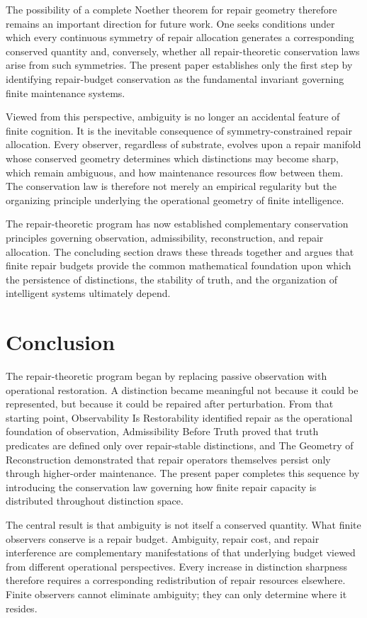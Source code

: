 \documentclass[12pt,oneside]{article}
\theoremstyle{plain}
\theoremstyle{definition}
\theoremstyle{remark}
\begin{document}
The possibility of a complete Noether theorem for repair geometry therefore remains an important direction for future work. One seeks conditions under which every continuous symmetry of repair allocation generates a corresponding conserved quantity and, conversely, whether all repair-theoretic conservation laws arise from such symmetries. The present paper establishes only the first step by identifying repair-budget conservation as the fundamental invariant governing finite maintenance systems.

Viewed from this perspective, ambiguity is no longer an accidental feature of finite cognition. It is the inevitable consequence of symmetry-constrained repair allocation. Every observer, regardless of substrate, evolves upon a repair manifold whose conserved geometry determines which distinctions may become sharp, which remain ambiguous, and how maintenance resources flow between them. The conservation law is therefore not merely an empirical regularity but the organizing principle underlying the operational geometry of finite intelligence.

The repair-theoretic program has now established complementary conservation principles governing observation, admissibility, reconstruction, and repair allocation. The concluding section draws these threads together and argues that finite repair budgets provide the common mathematical foundation upon which the persistence of distinctions, the stability of truth, and the organization of intelligent systems ultimately depend.

\section{Conclusion}

The repair-theoretic program began by replacing passive observation with operational restoration. A distinction became meaningful not because it could be represented, but because it could be repaired after perturbation. From that starting point, Observability Is Restorability identified repair as the operational foundation of observation, Admissibility Before Truth proved that truth predicates are defined only over repair-stable distinctions, and The Geometry of Reconstruction demonstrated that repair operators themselves persist only through higher-order maintenance. The present paper completes this sequence by introducing the conservation law governing how finite repair capacity is distributed throughout distinction space.

The central result is that ambiguity is not itself a conserved quantity. What finite observers conserve is a repair budget. Ambiguity, repair cost, and repair interference are complementary manifestations of that underlying budget viewed from different operational perspectives. Every increase in distinction sharpness therefore requires a corresponding redistribution of repair resources elsewhere. Finite observers cannot eliminate ambiguity; they can only determine where it resides.
\end{document}
